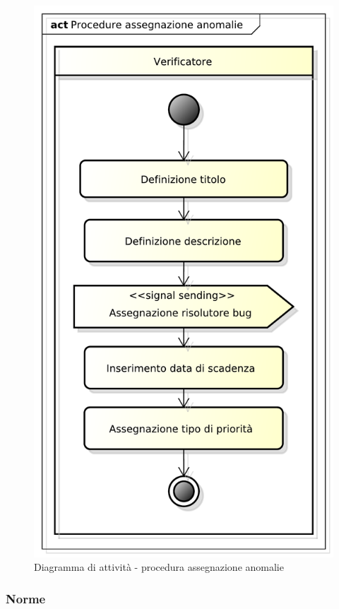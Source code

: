 			\begin{figure}[htbp]
				\centering
				\includegraphics[scale=0.4]{images/proc_assegnazione_anomalie.pdf}
				\caption{Diagramma di attività - procedura assegnazione anomalie}
				\label{fig:procedura_assegnazione_anomalie}
			\end{figure}


		\subsubsection{Norme}
		\label{ssub:norme}
			

